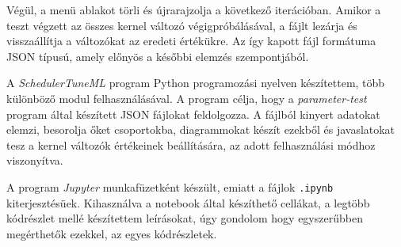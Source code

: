 Végül, a menü ablakot törli és újrarajzolja a következő iterációban.
Amikor a teszt végzett az összes kernel változó végigpróbálásával, a fájlt lezárja és visszaállítja a változókat az eredeti értékükre.
Az így kapott fájl formátuma JSON típusú, amely előnyös a későbbi elemzés szempontjából.


A \textit{SchedulerTuneML} program Python programozási nyelven készítettem, több különböző modul felhasználásával.
A program célja, hogy a \textit{parameter-test} program által készített JSON fájlokat feldolgozza. A fájlból kinyert adatokat elemzi, besorolja őket csoportokba, diagrammokat készít ezekből és javaslatokat tesz a kernel változók értékeinek beállítására, az adott felhasználási módhoz viszonyítva.


A program \textit{Jupyter} munkafüzetként készült, emiatt a fájlok \texttt{.ipynb} kiterjesztésüek. Kihasználva a notebook által készíthető cellákat, a legtöbb kódrészlet mellé készítettem leírásokat, úgy gondolom hogy egyszerűbben megérthetők ezekkel, az egyes kódrészletek.

